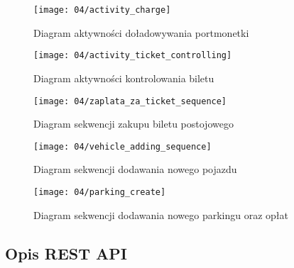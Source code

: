 \begin{figure}[p]
	\begin{center}
		\texttt{[image: 04/activity\_charge]}
	\end{center}
	\caption{Diagram aktywności doładowywania portmonetki}
\end{figure}

\begin{figure}[p]
	\begin{center}
		\texttt{[image: 04/activity\_ticket\_controlling]}
	\end{center}
	\caption{Diagram aktywności kontrolowania biletu}
\end{figure}

\begin{figure}[p]
	\begin{center}
		\texttt{[image: 04/zaplata\_za\_ticket\_sequence]}
	\end{center}
	\caption{Diagram sekwencji zakupu biletu postojowego}
\end{figure}

\begin{figure}[p]
	\begin{center}
		\texttt{[image: 04/vehicle\_adding\_sequence]}
	\end{center}
	\caption{Diagram sekwencji dodawania nowego pojazdu}
\end{figure}

\begin{figure}[p]
	\begin{center}
		\texttt{[image: 04/parking\_create]}
	\end{center}
	\caption{Diagram sekwencji dodawania nowego parkingu oraz opłat}
\end{figure}

\newpage



\subsection{Opis REST API}

